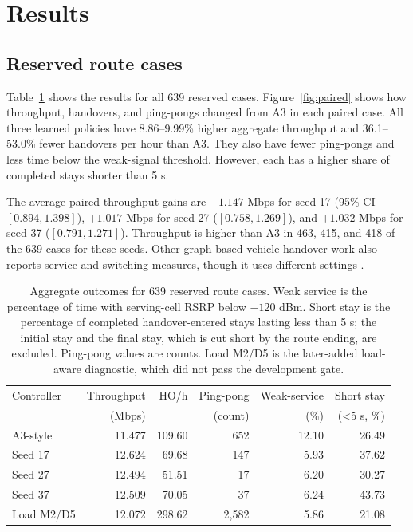 \documentclass[fleqn,10pt,twoside]{IOEGC}
\begin{document}
\section{Results}
\subsection{Reserved route cases}
Table~\ref{tab:heldout} shows the results for all 639 reserved cases. Figure~\ref{fig:paired} shows how throughput, handovers, and ping-pongs changed from A3 in each paired case. All three learned policies have 8.86--9.99\% higher aggregate throughput and 36.1--53.0\% fewer handovers per hour than A3. They also have fewer ping-pongs and less time below the weak-signal threshold. However, each has a higher share of completed stays shorter than 5 s.

The average paired throughput gains are $+1.147$ Mbps for seed 17 (95\% CI $[0.894,1.398]$), $+1.017$ Mbps for seed 27 ($[0.758,1.269]$), and $+1.032$ Mbps for seed 37 ($[0.791,1.271]$). Throughput is higher than A3 in 463, 415, and 418 of the 639 cases for these seeds. Other graph-based vehicle handover work also reports service and switching measures, though it uses different settings \cite{mehregan2025}.

\begin{table}[H]
  \caption{Aggregate outcomes for 639 reserved route cases. Weak service is the percentage of time with serving-cell RSRP below $-120$ dBm. Short stay is the percentage of completed handover-entered stays lasting less than 5 s; the initial stay and the final stay, which is cut short by the route ending, are excluded. Ping-pong values are counts. Load M2/D5 is the later-added load-aware diagnostic, which did not pass the development gate.}
  \label{tab:heldout}
  \centering\scriptsize\setlength{\tabcolsep}{2.4pt}
  \begin{tabular}{lrrrrr}
    \toprule
    Controller & Throughput & HO/h & Ping-pong & Weak-service & Short stay \\
    & (Mbps) & & (count) & (\%) & (<5 s, \%) \\
    \midrule
    A3-style & 11.477 & 109.60 & 652 & 12.10 & 26.49 \\
    Seed 17 & 12.624 & 69.68 & 147 & 5.93 & 37.62 \\
    Seed 27 & 12.494 & 51.51 & 17 & 6.20 & 30.27 \\
    Seed 37 & 12.509 & 70.05 & 37 & 6.24 & 43.73 \\
    Load M2/D5 & 12.072 & 298.62 & 2,582 & 5.86 & 21.08 \\
    \bottomrule
  \end{tabular}
\end{table}
\end{document}
